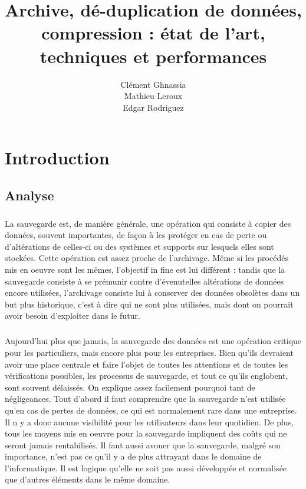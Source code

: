 \documentclass[a4paper,11pt]{report}
\title{Archive, dé-duplication de données, compression : état de l'art, techniques et performances}
\author{Clément Ghnassia \\Mathieu Leroux \\Edgar Rodriguez}
\begin{document}
\maketitle

\chapter{Introduction}

\section{Analyse}

\paragraph{}
La sauvegarde est, de manière générale, une opération qui consiste à copier des données, souvent importantes, de façon à les protéger en cas de perte ou d'altérations de celles-ci ou des systèmes et supports sur lesquels elles sont stockées. 
Cette opération est assez proche de l'archivage. Même si les procédés mis en oeuvre sont les mêmes, l'objectif in fine est lui différent : 
tandis que la sauvegarde consiste à se prémunir contre d'évenutelles altérations de données encore utilisées, l'archivage consiste lui à conserver des données obsolètes dans un but plus historique, c'est à dire qui ne sont plus utilisées, mais dont on pourrait avoir besoin d'exploiter dans le futur.

\paragraph{}
Aujourd'hui plus que jamais, la sauvegarde des données est une opération critique pour les particuliers, mais encore plus pour les entreprises.
Bien qu'ils devraient avoir une place centrale et faire l'objet de toutes les attentions et de toutes les vérifications possibles, les processus de sauvegarde, et tout ce qu'ils englobent, sont souvent délaissés.
On explique assez facilement pourquoi tant de négligeances. 
Tout d'abord il faut comprendre que la sauvegarde n'est utilisée qu'en cas de pertes de données, ce qui est normalement rare dans une entreprise. 
Il n y a donc aucune visibilité pour les utilisateurs dans leur quotidien.
De plus, tous les moyens mis en oeuvre pour la sauvegarde impliquent des coûts qui ne seront jamais rentabilisés.
Il faut aussi avouer que la sauvegarde, malgré son importance, n'est pas ce qu'il y a de plus attrayant dans le domaine de l'informatique. 
Il est logique qu'elle ne soit pas aussi développée et normalisée que d'autres éléments dans le même domaine.
\end{document}
